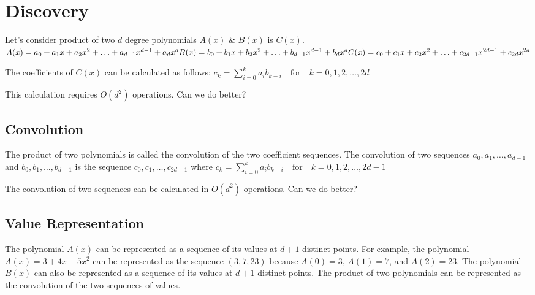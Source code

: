 \documentclass{report}
\begin{document}
\tableofcontents

\newpage
\chapter{Discovery}
Let's consider product of two \(d\) degree polynomials \(A(x)\) & \(B(x)\) is \(C(x)\).
\begin{math}
	
	A(x) = a_0 + a_1x + a_2x^2 + \ldots + a_{d-1}x^{d-1} + a_dx^d \\
	B(x) = b_0 + b_1x + b_2x^2 + \ldots + b_{d-1}x^{d-1} + b_dx^d \\
	C(x) = c_0 + c_1x + c_2x^2 + \ldots + c_{2d-1}x^{2d-1} + c_{2d}x^{2d}
\end{math}

The coefficients of \(C(x)\) can be calculated as follows:
\begin{math}
	c_k = \sum_{i=0}^{k} a_ib_{k-i} \quad \text{for} \quad k = 0, 1, 2, \ldots, 2d
\end{math}

This calculation requires \(O(d^2)\) operations. Can we do better?

\section{Convolution}
The product of two polynomials is called the convolution of the two coefficient sequences. The convolution of two sequences \(a_0, a_1, \ldots, a_{d-1}\) and \(b_0, b_1, \ldots, b_{d-1}\) is the sequence \(c_0, c_1, \ldots, c_{2d-1}\) where
\begin{math}
	c_k = \sum_{i=0}^{k} a_ib_{k-i} \quad \text{for} \quad k = 0, 1, 2, \ldots, 2d-1
\end{math}

The convolution of two sequences can be calculated in \(O(d^2)\) operations. Can we do better?

\section{Value  Representation}

The polynomial \(A(x)\) can be represented as a sequence of its values at \(d+1\) distinct points. For example, the polynomial \(A(x) = 3 + 4x + 5x^2\) can be represented as the sequence \((3, 7, 23)\) because \(A(0) = 3\), \(A(1) = 7\), and \(A(2) = 23\). The polynomial \(B(x)\) can also be represented as a sequence of its values at \(d+1\) distinct points. The product of two polynomials can be represented as the convolution of the two sequences of values.
\end{document}
